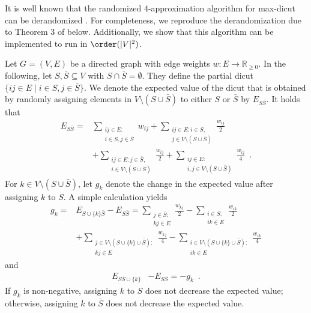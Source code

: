 It is well known that the randomized $4$-approximation algorithm for max-dicut can be derandomized \citep{halperin2001combinatorial,bar2012online}.
For completeness, we reproduce the derandomization due to Theorem 3 of \citet{bar2012online} below.
Additionally, we show that this algorithm can be implemented to run in $\order(|V|^2)$.

Let $G=(V, E)$ be a directed graph with edge weights $w:E \to \mathbb{R}_{\geq 0}$.
In the following, let $S, \bar{S} \subseteq V$ with $S \cap \bar{S} = \emptyset$.
They define the partial dicut $\{ij \in E \mid i \in S, j \in \bar{S}\}$.
We denote the expected value of the dicut that is obtained by randomly assigning elements in $V \setminus (S \cup \bar{S})$ to either $S$ or $\bar{S}$ by $E_{S\bar{S}}$.
It holds that
\begin{align*}
    E_{S\bar{S}} = 
        &   \sum_{\substack{ij \in E: \\ i \in S, j \in \bar{S}}} w_{ij} 
          + \sum_{\substack{ij \in E: i \in S, \\ j \in V \setminus (S \cup \bar{S})}} \frac{w_{ij}}{2} \\
        & + \sum_{\substack{ij \in E: j \in \bar{S}, \\ i \in V \setminus (S \cup \bar{S})}} \frac{w_{ij}}{2} 
          + \sum_{\substack{ij \in E: \\ i,j \in V \setminus (S \cup \bar{S})}} \frac{w_{ij}}{4} \enspace . 
\end{align*}
For $k \in V \setminus (S \cup \bar{S})$, let $g_k$ denote the change in the expected value after assigning $k$ to $S$.
A simple calculation yields
\begin{align*}
    g_k = & E_{S\cup\{k\}\bar{S}} - E_{S\bar{S}} = 
        \sum_{\substack{j \in \bar{S}: \\ kj \in E}} \frac{w_{kj}}{2}
        - \sum_{\substack{i \in S: \\ ik \in E}} \frac{w_{ik}}{2} \\
        & + \sum_{\substack{j \in V \setminus (S \cup \{k\} \cup \bar{S}): \\ kj \in E}} \frac{w_{kj}}{4}
        - \sum_{\substack{i \in V \setminus (S \cup \{k\} \cup \bar{S}): \\ ik \in E}} \frac{w_{ik}}{4}
\end{align*}
and 
\begin{align*}
    E_{S\bar{S}\cup\{k\}} &- E_{S\bar{S}} = - g_k \enspace .
\end{align*}
If $g_k$ is non-negative, assigning $k$ to $S$ does not decrease the expected value; otherwise, assigning $k$ to $\bar{S}$ does not decrease the expected value.

